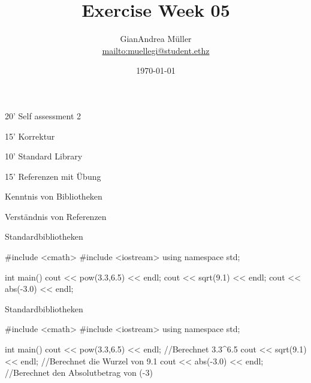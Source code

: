 \ifnum\conditionmacro=1 \documentclass[handout,usenames,dvipsnames]{beamer}\fi
\title{Exercise Week 05}
\author{GianAndrea Müller\\ \url{mailto:muellegi@student.ethz}}
\date{\today}
\begin{document}
\maketitle

\begin{TFTimeSchedule} 
\item 20' Self assessment 2
\item 15' Korrektur
\item 10' Standard Library
\item 15' Referenzen mit Übung
\end{TFTimeSchedule}

\begin{TFLearningObjectives}
\item Kenntnis von Bibliotheken
\item Verständnis von Referenzen
\end{TFLearningObjectives}

\begin{frame}[fragile]{Standardbibliotheken}
\begin{TFCpp}
#include <cmath>
#include <iostream>
using namespace std;

int main(){
	cout << pow(3.3,6.5) << endl;
	cout << sqrt(9.1) << endl;
	cout << abs(-3.0) << endl;
}
\end{TFCpp}
\end{frame}


\begin{frame}[fragile]{Standardbibliotheken}
\begin{TFCpp}
#include <cmath>
#include <iostream>
using namespace std;

int main(){
	cout << pow(3.3,6.5) << endl;
	//Berechnet 3.3^6.5
	cout << sqrt(9.1) << endl;
	//Berechnet die Wurzel von 9.1
	cout << abs(-3.0) << endl;
	//Berechnet den Absolutbetrag von (-3)
}
\end{TFCpp}
\end{frame}

\end{document}
